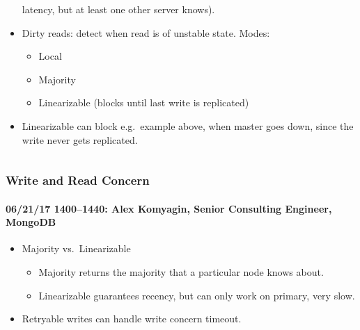\documentclass[xcolor=dvipsnames, 9pt]{beamer}
\begin{document}
\begin{frame}
\begin{columns}
\begin{column}{0.5\textwidth}
\begin{itemize}
                    latency, but at least one other server knows).
                \item Dirty reads: detect when read is of unstable state. Modes:
                    \begin{itemize}
                        \item Local
                        \item Majority
                        \item Linearizable (blocks until last write is
                            replicated)
                    \end{itemize}
                \item Linearizable can block e.g.\ example above, when master
                    goes down, since the write never gets replicated.
            \end{itemize}
        \end{column}
    \end{columns}
\end{frame}

\begin{frame}
    \frametitle{Write and Read Concern}
    \framesubtitle{%
        06/21/17 1400--1440:
        Alex Komyagin, Senior Consulting Engineer, MongoDB
    }
    \begin{itemize}
        \item Majority vs.\ Linearizable
            \begin{itemize}
                \item Majority returns the majority that a particular
                    node knows about.
                \item Linearizable guarantees recency, but can only work
                    on primary, very slow.
            \end{itemize}
        \item Retryable writes can handle write concern timeout.
    \end{itemize}
\end{frame}
\end{document}
